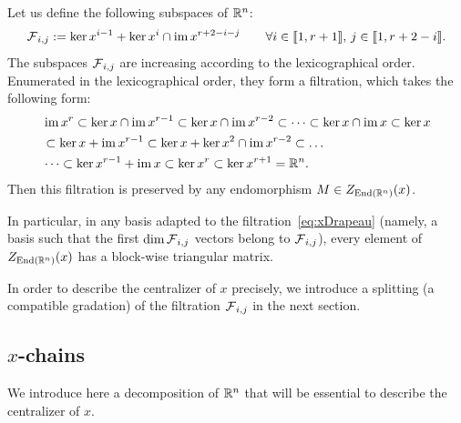 \documentclass[english]{article}
\begin{document}
\begin{lemma}
    Let us define the following subspaces of $\mathbb{R}^n$:
    \begin{equation}\label{eq:defFij}
        \operatorname{\mathcal{F}}_{i,j}
            := \ker x^{i-1} + \ker x^i \cap \operatorname{im} x^{r+2-i-j}
        \qquad
        \forall i \in \llbracket 1 , r + 1 \rrbracket, \,
        j \in \llbracket 1 , r + 2 -i \rrbracket
    .\end{equation}
    The subspaces $\operatorname{\mathcal{F}}_{i,j}$ are increasing according to the lexicographical order. Enumerated in the lexicographical order, they form a filtration, which takes the following form:
%    
    \begin{equation}\label{eq:xDrapeau}
    \begin{aligned}
        &\operatorname{im} x^{r}
            \subset \ker x \cap \operatorname{im} x^{r-1}
            \subset \ker x \cap \operatorname{im} x^{r-2}
            \subset \dots
            \subset  \ker x \cap \operatorname{im} x
            \subset \ker x
            \\
        &\subset \ker x + \operatorname{im} x^{r-1}
        \subset \ker x + \ker x^2 \cap \operatorname{im} x^{r-2}
        \subset \dots
        \\
        &\dots 
        \subset \ker x^{r-1} + \operatorname{im} x
        \subset \ker x^{r}
        \subset \ker x^{r+1} = \mathbb{R}^n
    .\end{aligned}
    \end{equation}
%
    Then this filtration is preserved by any endomorphism $M\in Z_{\operatorname{End}(\mathbb{R}^n)} (x)$.
\end{lemma}

In particular, in any basis adapted to the filtration~\eqref{eq:xDrapeau} (namely, a basis such that the first $\dim \operatorname{\mathcal{F}}_{i,j}$ vectors belong to $\operatorname{\mathcal{F}}_{i,j}$), every element of $Z_{\operatorname{End}(\mathbb{R}^n)} (x)$ has a block-wise triangular matrix. 

In order to describe the centralizer of $x$ precisely, we introduce a splitting (a compatible gradation) of the filtration $\operatorname{\mathcal{F}}_{i,j}$ in the next section.

\subsection{$x$-chains}

We introduce here a decomposition of $\mathbb{R}^n$ that will be essential to describe the centralizer of $x$.
\end{document}
